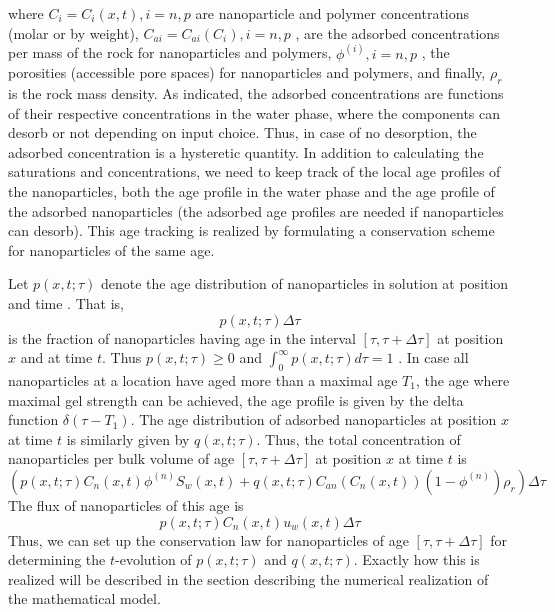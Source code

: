 where $C_i=C_i(x,t), i=n,p$ are nanoparticle and polymer concentrations (molar or by weight), $C_{ai}=C_{ai}(C_i), i=n,p$ , are the adsorbed concentrations per mass of the rock for nanoparticles and polymers, $\phi^{(i)}, i=n,p$ , the porosities (accessible pore spaces) for nanoparticles and polymers, and finally, $\rho_r$ is the rock mass density. As indicated, the adsorbed concentrations are functions of their respective concentrations in the water phase, where the components can desorb or not depending on input choice. Thus, in case of no desorption, the adsorbed concentration is a hysteretic quantity.   
In addition to calculating the saturations and concentrations, we need to keep track of the local age profiles of the nanoparticles, both the age profile in the water phase and the age profile of the adsorbed nanoparticles (the adsorbed age profiles are needed if nanoparticles can desorb). This age tracking is realized by formulating a conservation scheme for nanoparticles of the same age.   

Let  $p(x,t;\tau)$ denote the age distribution of nanoparticles in solution at position  and time  . That is, 
\begin{equation*}
    p(x,t;\tau)\Delta\tau
\end{equation*}
is the fraction of nanoparticles having age in the interval $[\tau, \tau+\Delta\tau]$  at position $x$ and at time $t$. Thus $p(x,t;\tau)\geq 0$ and $\int_{0}^{\infty}{p(x,t;\tau)d\tau}=1$ . In case all nanoparticles at a location have aged more than a maximal age $T_1$, the age where maximal gel strength can be achieved, the age profile is given by the delta function $\delta(\tau-T_1)$. The age distribution of adsorbed nanoparticles at position $x$ at time $t$ is similarly given by $q(x,t;\tau)$. Thus, the total concentration of nanoparticles per bulk volume of age  $[\tau, \tau+\Delta\tau]$ at position $x$ at time $t$ is
\begin{equation}
    \left(p(x,t;\tau)C_n(x,t)\phi^{(n)}S_w(x,t)+q(x,t;\tau)C_{an}\left(C_n(x,t)\right)(1-\phi^{(n)})\rho_r\right)\Delta\tau
\end{equation}
The flux of nanoparticles of this age is
\begin{equation}
    p(x,t;\tau)C_n(x,t)u_w(x,t)\Delta\tau
\end{equation}
Thus, we can set up the conservation law for nanoparticles of age $[\tau, \tau+\Delta\tau]$  for determining the   $t$-evolution of $p(x,t;\tau)$ and $q(x,t;\tau)$. Exactly how this is realized will be described in the section describing the numerical realization of the mathematical model.

